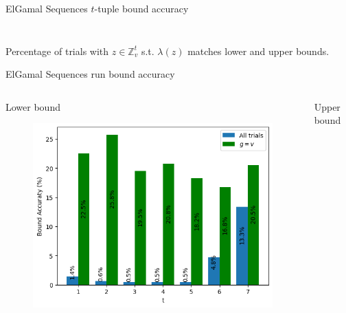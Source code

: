 \begin{frame}{ElGamal Sequences $t$-tuple bound accuracy}
\begin{columns}
\begin{column}{0.45\textwidth}
\begin{figure}
            \end{figure}
        \end{column}
    \end{columns}
    \begin{center}
                Percentage of trials with $z\in\mathbb{Z}_v^t$ s.t. $\lambda(z)$ matches lower and upper bounds.
    \end{center}
\end{frame}


\begin{frame}{ElGamal Sequences run bound accuracy}
    \begin{columns}
        \begin{column}{0.45\textwidth}
        \begin{center}
            Lower bound
        \end{center}
            \begin{figure}
                \centering
                \includegraphics[width=\textwidth]{figures/RunsLowerBoundAccuracygisv.png}
            \end{figure}
        \end{column}
        \begin{column}{0.45\textwidth}
        \begin{center}
            Upper bound 
        \end{center}
            \begin{figure}
                \centering

\end{figure}
\end{column}
\end{columns}
\end{frame}

